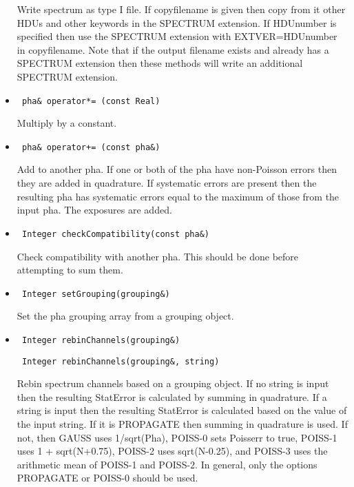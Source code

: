 \documentclass[11pt]{book}
\begin{document}
\begin{itemize}
          Write spectrum as type I file. If copyfilename is given then
          copy from it other HDUs and other keywords in the SPECTRUM
          extension. If HDUnumber is specified then use the SPECTRUM
          extension with EXTVER=HDUnumber in copyfilename. Note that 
          if the output filename exists and already has a SPECTRUM 
          extension then these methods will write an
          additional SPECTRUM extension.

\item  \begin{verbatim} pha& operator*= (const Real) \end{verbatim}

           Multiply by a constant.

\item  \begin{verbatim} pha& operator+= (const pha&) \end{verbatim}

           Add to another pha. If one or both of the pha have
           non-Poisson errors then they are added in quadrature. If
           systematic errors are present then the resulting pha has
           systematic errors equal to the maximum of those from the
           input pha. The exposures are added.

\item  \begin{verbatim} Integer checkCompatibility(const pha&) \end{verbatim}

           Check compatibility with another pha. This should be done
           before attempting to sum them.

\item  \begin{verbatim} Integer setGrouping(grouping&) \end{verbatim}

           Set the pha grouping array from a grouping object.

\item  \begin{verbatim} Integer rebinChannels(grouping&) \end{verbatim}
       \begin{verbatim} Integer rebinChannels(grouping&, string) \end{verbatim}

           Rebin spectrum channels based on a grouping object. If no
           string is input then the resulting StatError is calculated
           by summing in quadrature. If a string is input then the
           resulting StatError is calculated based on the value of the
           input string. If it is PROPAGATE then summing in quadrature
           is used. If not, then GAUSS uses 1/sqrt(Pha), POISS-0 sets
           Poisserr to true, POISS-1 uses 1 + sqrt(N+0.75), POISS-2
           uses sqrt(N-0.25), and POISS-3 uses the arithmetic mean of
           POISS-1 and POISS-2. In general, only the options PROPAGATE
           or POISS-0 should be used.


\end{itemize}
\end{document}
